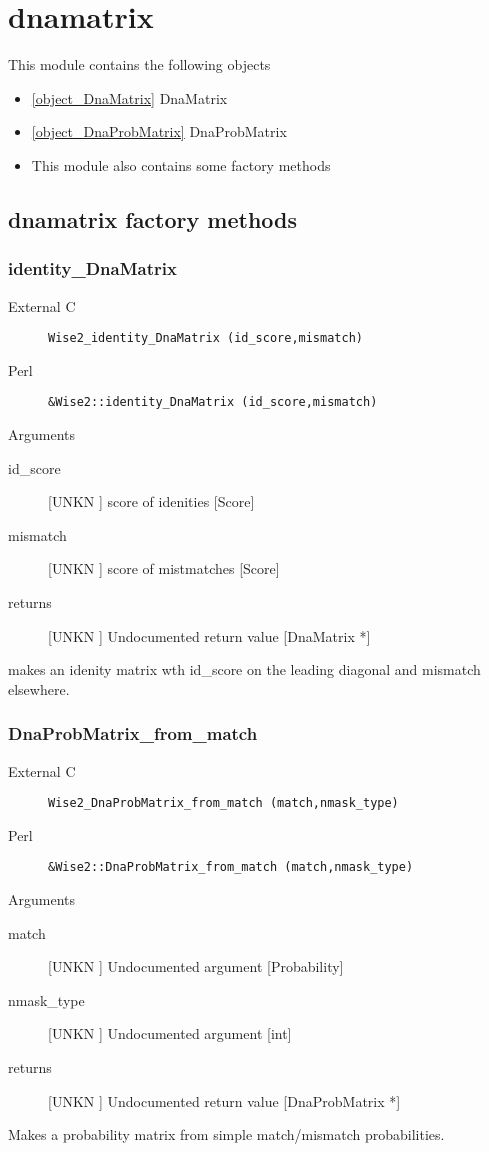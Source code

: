 \section{dnamatrix}
\label{module_dnamatrix}
This module contains the following objects

\begin{itemize}
\item \ref{object_DnaMatrix} DnaMatrix

\item \ref{object_DnaProbMatrix} DnaProbMatrix

\item This module also contains some factory methods
\end{itemize}
\subsection{dnamatrix factory methods}
\subsubsection{identity_DnaMatrix}
\begin{description}
\item[External C] {\tt Wise2_identity_DnaMatrix (id_score,mismatch)}
\item[Perl] {\tt &Wise2::identity_DnaMatrix (id_score,mismatch)}

\end{description}
Arguments
\begin{description}
\item[id_score] [UNKN ] score of idenities [Score]
\item[mismatch] [UNKN ] score of mistmatches [Score]
\item[returns] [UNKN ] Undocumented return value [DnaMatrix *]
\end{description}
makes an idenity matrix wth id_score on the leading
diagonal and mismatch elsewhere.




\subsubsection{DnaProbMatrix_from_match}
\begin{description}
\item[External C] {\tt Wise2_DnaProbMatrix_from_match (match,nmask_type)}
\item[Perl] {\tt &Wise2::DnaProbMatrix_from_match (match,nmask_type)}

\end{description}
Arguments
\begin{description}
\item[match] [UNKN ] Undocumented argument [Probability]
\item[nmask_type] [UNKN ] Undocumented argument [int]
\item[returns] [UNKN ] Undocumented return value [DnaProbMatrix *]
\end{description}
Makes a probability matrix from simple match/mismatch 
probabilities.




